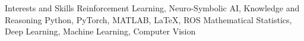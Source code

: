 
\begin{rubric}{Interests and Skills}
	Reinforcement Learning, Neuro-Symbolic AI, Knowledge and Reasoning
	Python, PyTorch, MATLAB, \LaTeX, ROS
	Mathematical Statistics, Deep Learning, Machine Learning, Computer Vision
\end{rubric}
